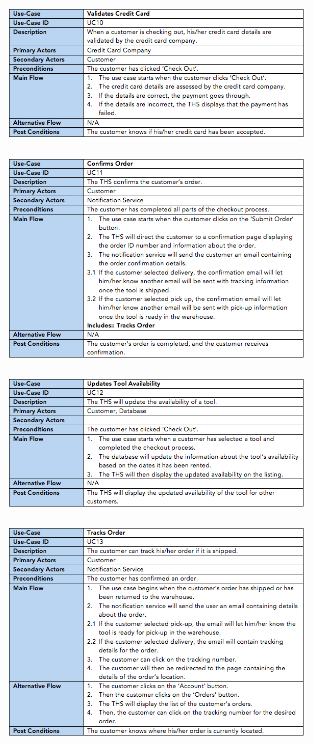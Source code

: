 \documentclass[fontsize=11pt]{extarticle}
\numberwithin{figure}{section} %
\numberwithin{table}{section}%
\begin{document}
\begin{figure}[H]
      \centering
      \includegraphics[trim = 0 0 0 0, clip, width=0.7\textwidth]{TempImg/UC10.png}
 \end{figure}

\begin{figure}[H]
      \centering
      \includegraphics[trim = 0 0 0 0, clip, width=0.7\textwidth]{TempImg/UC11.png}
 \end{figure}

\begin{figure}[H]
      \centering
      \includegraphics[trim = 0 0 0 0, clip, width=0.7\textwidth]{TempImg/UC12.png}
 \end{figure}

\begin{figure}[H]
      \centering
      \includegraphics[trim = 0 0 0 0, clip, width=0.7\textwidth]{TempImg/UC13.png}
 \end{figure}
\end{document}
